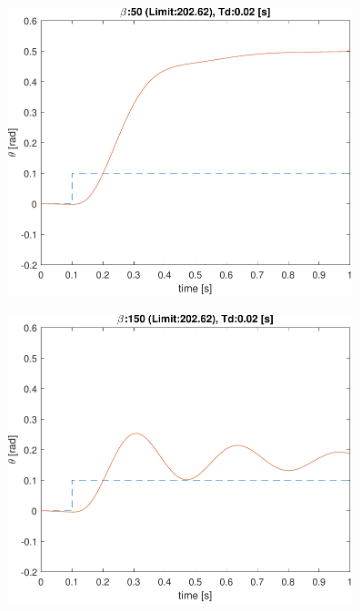 \begin{figure}[t!]
	\begin{subfigure}{0.33\linewidth}
	\centering
\includegraphics[width=0.95\linewidth]{../code/stretch/figs/result_gain_50_Td_0.02}
\caption{}
	\end{subfigure}\hfill
	\begin{subfigure}{0.33\linewidth}
	\centering
	\includegraphics[width=0.95\linewidth]{../code/stretch/figs/result_gain_150_Td_0.02}
	\caption{}
\end{subfigure}\hfill
	\begin{subfigure}{0.33\linewidth}
	\centering

\end{subfigure}
\end{figure}
